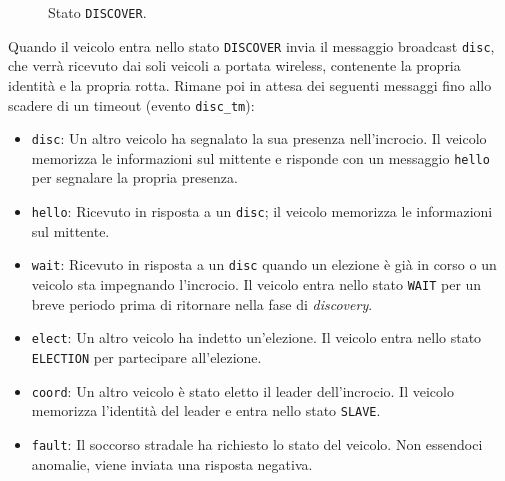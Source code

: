 \documentclass{memoir}
\begin{document}
\begin{figure}[h]
  \centering
  \caption{Stato \texttt{DISCOVER}.}                  
\end{figure}
Quando il veicolo entra nello stato \texttt{DISCOVER} invia il messaggio
broadcast \texttt{disc}, che verrà ricevuto dai soli veicoli a portata wireless,
contenente la propria identità e la propria rotta. Rimane poi in attesa dei
seguenti messaggi fino allo scadere di un timeout (evento \texttt{disc\_tm}):
\begin{itemize}
\item \texttt{disc}: Un altro veicolo ha segnalato la sua presenza
  nell'incrocio. Il veicolo memorizza le informazioni sul mittente e risponde
  con un messaggio \texttt{hello} per segnalare la propria presenza.
\item \texttt{hello}: Ricevuto in risposta a un \texttt{disc}; il veicolo
  memorizza le informazioni sul mittente.
\item \texttt{wait}: Ricevuto in risposta a un \texttt{disc} quando un elezione
  è già in corso o un veicolo sta impegnando l'incrocio. Il veicolo entra nello
  stato \texttt{WAIT} per un breve periodo prima di ritornare nella fase di
  \emph{discovery}.
\item \texttt{elect}: Un altro veicolo ha indetto un'elezione. Il veicolo entra
  nello stato \texttt{ELECTION} per partecipare all'elezione.
\item \texttt{coord}: Un altro veicolo è stato eletto il leader dell'incrocio.
  Il veicolo memorizza l'identità del leader e entra nello stato \texttt{SLAVE}.
\item \texttt{fault}: Il soccorso stradale ha richiesto lo stato del veicolo.
  Non essendoci anomalie, viene inviata una risposta negativa.
\end{itemize}
\end{document}

